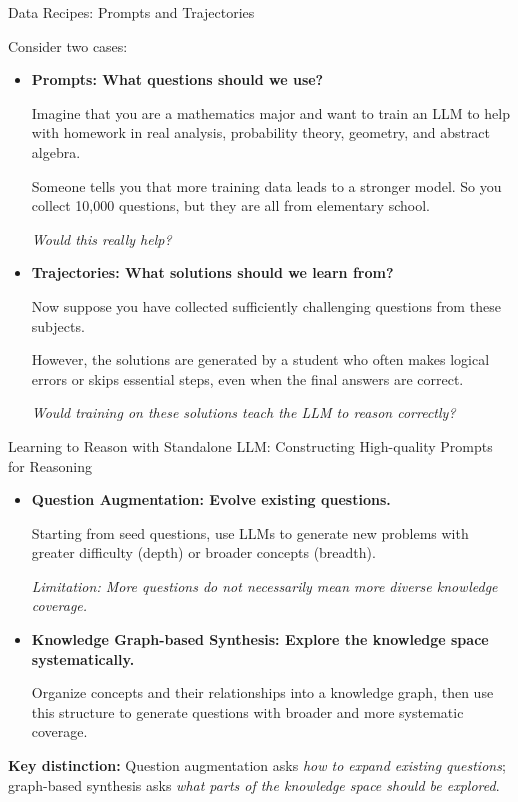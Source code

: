 \documentclass[aspectratio=169]{beamer}
\begin{document}
\begin{frame}{Data Recipes: Prompts and Trajectories}

Consider two cases:

\begin{itemize}
    \item \textbf{Prompts: What questions should we use?}

    Imagine that you are a mathematics major and want to train an LLM to help with homework in real analysis, probability theory, geometry, and abstract algebra.

    Someone tells you that more training data leads to a stronger model. So you collect 10,000 questions, but they are all from elementary school.

    \textit{Would this really help?}

    \vspace{0.3cm}

    \item \textbf{Trajectories: What solutions should we learn from?}

    Now suppose you have collected sufficiently challenging questions from these subjects.

    However, the solutions are generated by a student who often makes logical errors or skips essential steps, even when the final answers are correct.

    \textit{Would training on these solutions teach the LLM to reason correctly?}

\end{itemize}

\end{frame}
\begin{frame}{Learning to Reason with Standalone LLM: Constructing High-quality Prompts for Reasoning}

\begin{itemize}
    \item \textbf{Question Augmentation: Evolve existing questions.}

    Starting from seed questions, use LLMs to generate new problems with greater difficulty (depth) or broader concepts (breadth).

    \textit{Limitation: More questions do not necessarily mean more diverse knowledge coverage.}

    \vspace{0.4cm}

    \item \textbf{Knowledge Graph-based Synthesis: Explore the knowledge space systematically.}

    Organize concepts and their relationships into a knowledge graph, then use this structure to generate questions with broader and more systematic coverage.

\end{itemize}

\vspace{0.3cm}

\textbf{Key distinction:} Question augmentation asks \textit{how to expand existing questions}; graph-based synthesis asks \textit{what parts of the knowledge space should be explored}.

\end{frame}
\end{document}
